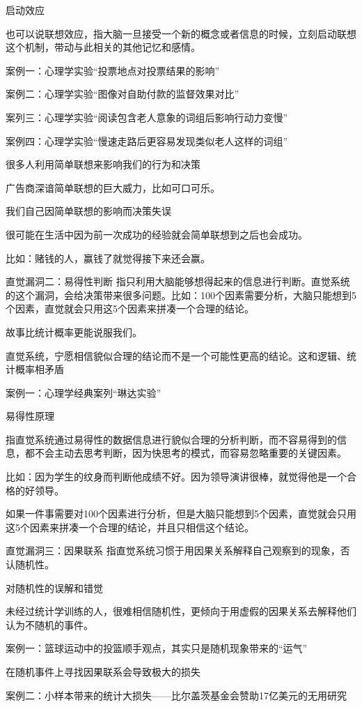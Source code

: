 \documentclass[12pt,]{krantz}
\begin{document}
启动效应

也可以说联想效应，指大脑一旦接受一个新的概念或者信息的时候，立刻启动联想这个机制，带动与此相关的其他记忆和感情。

案例一：心理学实验``投票地点对投票结果的影响''

案例二：心理学实验``图像对自助付款的监督效果对比''

案列三：心理学实验``阅读包含老人意象的词组后影响行动力变慢''

案例四：心理学实验``慢速走路后更容易发现类似老人这样的词组''

很多人利用简单联想来影响我们的行为和决策

广告商深谙简单联想的巨大威力，比如可口可乐。

我们自己因简单联想的影响而决策失误

很可能在生活中因为前一次成功的经验就会简单联想到之后也会成功。

比如：赌钱的人，赢钱了就觉得接下来还会赢。

直觉漏洞二：易得性判断
指只利用大脑能够想得起来的信息进行判断。直觉系统的这个漏洞，会给决策带来很多问题。比如：100个因素需要分析，大脑只能想到5个因素，直觉就会只用这5个因素来拼凑一个合理的结论。

故事比统计概率更能说服我们。

直觉系统，宁愿相信貌似合理的结论而不是一个可能性更高的结论。这和逻辑、统计概率相矛盾

案例一：心理学经典案列``琳达实验''

易得性原理

指直觉系统通过易得性的数据信息进行貌似合理的分析判断，而不容易得到的信息，都不会主动去思考判断，因为快思考的模式，而容易忽略重要的关键因素。

比如：因为学生的纹身而判断他成绩不好。因为领导演讲很棒，就觉得他是一个合格的好领导。

如果一件事需要对100个因素进行分析，但是大脑只能想到5个因素，直觉就会只用这5个因素来拼凑一个合理的结论，并且只相信这个结论。

直觉漏洞三：因果联系
指直觉系统习惯于用因果关系解释自己观察到的现象，否认随机性。

对随机性的误解和错觉

未经过统计学训练的人，很难相信随机性，更倾向于用虚假的因果关系去解释他们认为不随机的事件。

案例一：篮球运动中的投篮顺手观点，其实只是随机现象带来的``运气''

在随机事件上寻找因果联系会导致极大的损失

案例二：小样本带来的统计大损失------比尔盖茨基金会赞助17亿美元的无用研究
\end{document}
